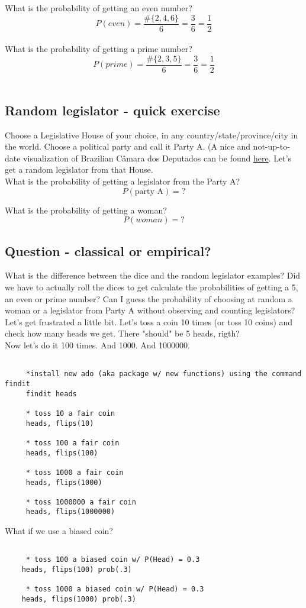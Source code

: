 \documentclass[11pt]{article}
\begin{document}
	What is the probability of getting an even number?\\
	\[P(even) = \frac{\#\{2, 4, 6\}}{6} = \frac{3}{6} = \frac{1}{2}	\]\\
		
	What is the probability of getting a prime number?\\
	\[P(prime) = \frac{\#\{2, 3, 5\}}{6} = \frac{3}{6} = \frac{1}{2}	\]\\	

	\subsection*{Random legislator - quick exercise}

	Choose a Legislative House of your choice, in any country/state/province/city in the world. Choose a political party and call it Party A. (A nice and not-up-to-date visualization of Brazilian Câmara dos Deputados can be found \href{http://g1.globo.com/politica/eleicoes/2014/nova-composicao-da-camara.html}{here}. Let's get a random legislator from that House.\\
	
	What is the probability of getting a legislator from the Party A?
	\[P(\text{party A}) = ?\]
	
	What is the probability of getting a woman?
	\[P(woman) = ?\]

	\subsection*{Question - classical or empirical?}

	What is the difference between the dice and the random legislator examples? Did we have to actually roll the dices to get calculate the probabilities of getting a 5, an even or prime number? Can I guess the probability of choosing at random a woman or a legislator from Party A without observing and counting legislators?\\

	Let's get frustrated a little bit. Let's toss a coin 10 times (or toss 10 coins) and check how many heads we get. There "should" be 5 heads, rigth?\\


	Now let's do it 100 times. And 1000. And 1000000.
	
	\begin{verbatim}

	 *install new ado (aka package w/ new functions) using the command findit
	 findit heads

	 * toss 10 a fair coin
	 heads, flips(10)

	 * toss 100 a fair coin
	 heads, flips(100)
	 
	 * toss 1000 a fair coin
	 heads, flips(1000)
	 
	 * toss 1000000 a fair coin
	 heads, flips(1000000)

	\end{verbatim}
	
	What if we use a biased coin?

	\begin{verbatim}

	 * toss 100 a biased coin w/ P(Head) = 0.3
	heads, flips(100) prob(.3)	 
	
	 * toss 1000 a biased coin w/ P(Head) = 0.3
	heads, flips(1000) prob(.3)	 

	\end{verbatim}
\end{document}
